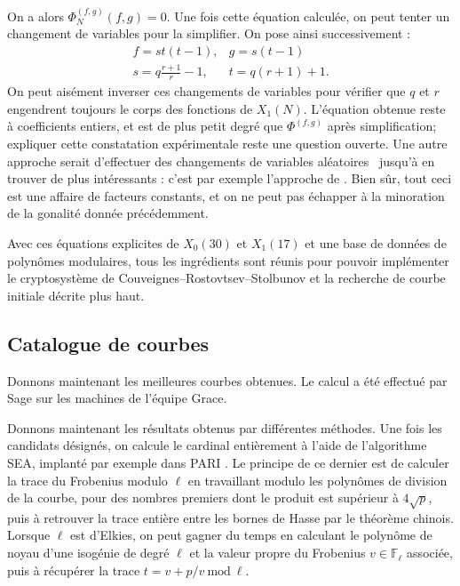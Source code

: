 \documentclass[11pt,a4paper]{article}
\newcommand{\F}{\mathbb{F}}
\renewcommand{\mod}{\ \mathrm{mod}\ }
\renewcommand{\v}{\vspace{5mm}}
\theoremstyle{definition}
\begin{document}
On a alors $\Phi_N^{(f, g)}(f, g) = 0$. Une fois cette équation calculée, on peut tenter un changement de variables pour la simplifier. On pose ainsi successivement :
$$\begin{matrix} f = st(t-1), & g = s(t-1)\\
 s = q\frac{r+1}{r} - 1, & t = q(r+1) + 1.
 \end{matrix}$$
On peut aisément inverser ces changements de variables pour vérifier que $q$ et $r$ engendrent toujours le corps des fonctions de $X_1(N)$. L'équation obtenue reste à coefficients entiers, et est de plus petit degré que $\Phi^{(f, g)}$ après simplification; expliquer cette constatation expérimentale reste une question ouverte. Une autre approche serait d'effectuer des changements de variables \og aléatoires \fg\ jusqu'à en trouver de plus intéressants : c'est par exemple l'approche de \cite{Sutheq}. Bien sûr, tout ceci est une affaire de facteurs constants, et on ne peut pas échapper à la minoration de la gonalité donnée précédemment.

\v
Avec ces équations explicites de $X_0(30)$ et $X_1(17)$ et une base de données de polynômes modulaires, tous les ingrédients sont réunis pour pouvoir implémenter le cryptosystème de Couveignes--Rostovtsev--Stolbunov et la recherche de courbe initiale décrite plus haut.

\subsection{Catalogue de courbes}

Donnons maintenant les meilleures courbes obtenues. Le calcul a été effectué par Sage sur les machines de l'équipe Grace.



Donnons maintenant les résultats obtenus par différentes méthodes. Une fois les candidats désignés, on calcule le cardinal entièrement à l'aide de l'algorithme SEA, implanté par exemple dans PARI \cite{PARI}. Le principe de ce dernier est de calculer la trace du Frobenius modulo $\ell$ en travaillant modulo les polynômes de division de la courbe, pour des nombres premiers dont le produit est supérieur à $4\sqrt{p}$, puis à retrouver la trace entière entre les bornes de Hasse par le théorème chinois. Lorsque $\ell$ est d'Elkies, on peut gagner du temps en calculant le polynôme de noyau d'une isogénie de degré $\ell$ et la valeur propre du Frobenius $v\in \F_\ell$ associée, puis à récupérer la trace $t = v + p/v \mod\ell.$
\end{document}
